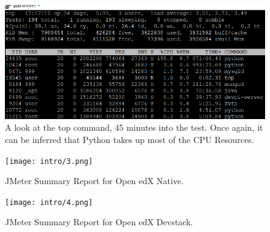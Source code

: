 \documentclass[12pt]{report}
\begin{document}
\begin{figure}[h!]
	\centering
	\includegraphics[width=\textwidth,height=\textheight,keepaspectratio]{Downloads/EkalavyaSummerInternship2019/latex-template/intro/S3_harshit_new.png}
	\caption{A look at the top command, 45 minutes into the test. Once again, it can be inferred that Python takes up most of the CPU Resources.}
\end{figure}


\begin{figure}[h!]
	\centering
	\texttt{[image: intro/3.png]}
	\caption{JMeter Summary Report for Open edX Native.}
\end{figure}

\begin{figure}[h!]
	\centering
	\texttt{[image: intro/4.png]}
	\caption{JMeter Summary Report for Open edX Devstack.}
\end{figure}
\clearpage
\end{document}
